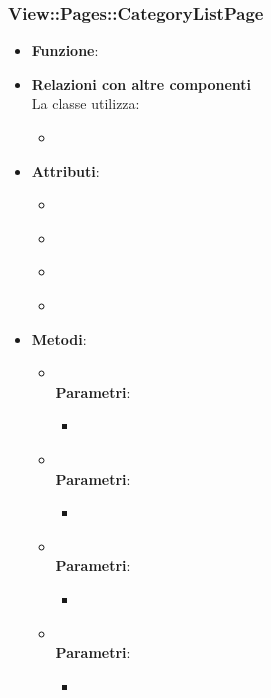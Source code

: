 \subsubsection{View::Pages::CategoryListPage}
\begin{itemize}
\item\textbf{Funzione}:
\item\textbf{Relazioni con altre componenti}\\
La classe utilizza:
	\begin{itemize}
		\item
	\end{itemize}
\item\textbf{Attributi}:
	\begin{itemize}
		\item\code{}\\
		\item\code{}\\
		\item\code{}\\
		\item\code{}\\
	\end{itemize}
\item\textbf{Metodi}:
	\begin{itemize}
		\item\code{}\\
		\textbf{Parametri}:
			\begin{itemize}
				\item\code{}\\
			\end{itemize}
		\item\code{}\\
		\textbf{Parametri}:
			\begin{itemize}
				\item\code{}\\
			\end{itemize}
		\item\code{}\\
		\textbf{Parametri}:
			\begin{itemize}
				\item\code{}\\
			\end{itemize}
		\item\code{}\\
		\textbf{Parametri}:
			\begin{itemize}
				\item\code{}\\
			\end{itemize}
	\end{itemize}
\end{itemize}

